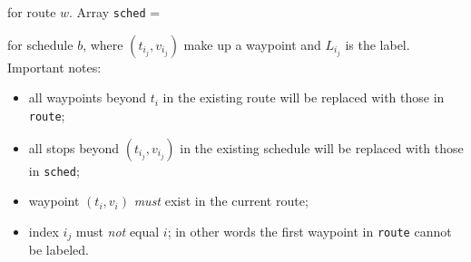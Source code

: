 \documentclass{article}
\theoremstyle{definition}                   %
\begin{document}
\noindent for route $w$. Array {\tt{}sched} =

\noindent
{}

\noindent for schedule $b$, where $(t_{i_j},v_{i_j})$ make up a waypoint and
$L_{i_j}$ is the label. Important notes:
\begin{itemize}
\item all waypoints beyond $t_i$ in the existing route will be replaced with
those in {\tt{}route};
\item all stops beyond $(t_{i_j},v_{i_j})$ in the existing schedule will be
replaced with those in {\tt{}sched};
\item waypoint $(t_i,v_i)$ \emph{must} exist in the current route;
\item index $i_j$ must \emph{not} equal $i$; in other words the first waypoint
in {\tt{}route} cannot be labeled.
\end{itemize}
\end{document}

